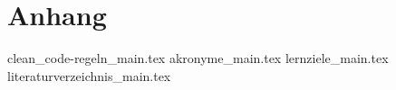 \part{Anhang}

{clean_code-regeln_main.tex}
{akronyme_main.tex}
{lernziele_main.tex}
{literaturverzeichnis_main.tex}
